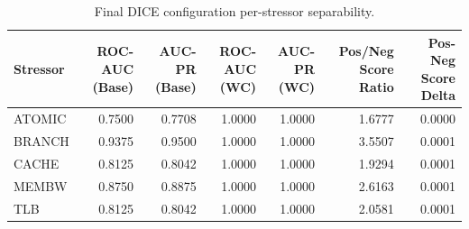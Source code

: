 \begin{table}[t]
\centering
\caption{Final DICE configuration per-stressor separability.}
\label{tab:dice_full_stressor}
\footnotesize
\begin{tabular}{lrrrrrr}
\toprule
Stressor & ROC-AUC (Base) & AUC-PR (Base) & ROC-AUC (WC) & AUC-PR (WC) & Pos/Neg Score Ratio & Pos-Neg Score Delta \\
\midrule
ATOMIC & 0.7500 & 0.7708 & 1.0000 & 1.0000 & 1.6777 & 0.0000 \\
BRANCH & 0.9375 & 0.9500 & 1.0000 & 1.0000 & 3.5507 & 0.0001 \\
CACHE & 0.8125 & 0.8042 & 1.0000 & 1.0000 & 1.9294 & 0.0001 \\
MEMBW & 0.8750 & 0.8875 & 1.0000 & 1.0000 & 2.6163 & 0.0001 \\
TLB & 0.8125 & 0.8042 & 1.0000 & 1.0000 & 2.0581 & 0.0001 \\
\bottomrule
\end{tabular}

\end{table}
